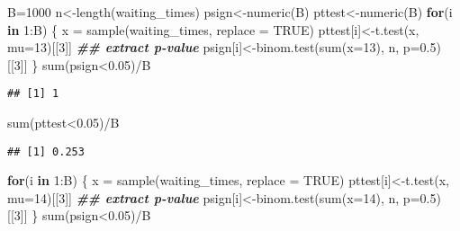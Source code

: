 \documentclass[
]{article}
\newenvironment{Shaded}{\begin{snugshade}}{\end{snugshade}}
\newcommand{\AttributeTok}[1]{\textcolor[rgb]{0.77,0.63,0.00}{#1}}
\newcommand{\ConstantTok}[1]{\textcolor[rgb]{0.00,0.00,0.00}{#1}}
\newcommand{\ControlFlowTok}[1]{\textcolor[rgb]{0.13,0.29,0.53}{\textbf{#1}}}
\newcommand{\DecValTok}[1]{\textcolor[rgb]{0.00,0.00,0.81}{#1}}
\newcommand{\DocumentationTok}[1]{\textcolor[rgb]{0.56,0.35,0.01}{\textbf{\textit{#1}}}}
\newcommand{\FloatTok}[1]{\textcolor[rgb]{0.00,0.00,0.81}{#1}}
\newcommand{\FunctionTok}[1]{\textcolor[rgb]{0.00,0.00,0.00}{#1}}
\newcommand{\NormalTok}[1]{#1}
\newcommand{\OtherTok}[1]{\textcolor[rgb]{0.56,0.35,0.01}{#1}}
\newcommand{\SpecialCharTok}[1]{\textcolor[rgb]{0.00,0.00,0.00}{#1}}
\begin{document}
\begin{Shaded}
\begin{Highlighting}[]
\NormalTok{B}\OtherTok{=}\DecValTok{1000}
\NormalTok{n}\OtherTok{\textless{}{-}}\FunctionTok{length}\NormalTok{(waiting\_times)}
\NormalTok{psign}\OtherTok{\textless{}{-}}\FunctionTok{numeric}\NormalTok{(B)}
\NormalTok{pttest}\OtherTok{\textless{}{-}}\FunctionTok{numeric}\NormalTok{(B)}
\ControlFlowTok{for}\NormalTok{(i }\ControlFlowTok{in} \DecValTok{1}\SpecialCharTok{:}\NormalTok{B) \{}
\NormalTok{  x }\OtherTok{=} \FunctionTok{sample}\NormalTok{(waiting\_times, }\AttributeTok{replace =} \ConstantTok{TRUE}\NormalTok{)}
\NormalTok{  pttest[i]}\OtherTok{\textless{}{-}}\FunctionTok{t.test}\NormalTok{(x, }\AttributeTok{mu=}\DecValTok{13}\NormalTok{)[[}\DecValTok{3}\NormalTok{]] }\DocumentationTok{\#\# extract p{-}value}
\NormalTok{  psign[i]}\OtherTok{\textless{}{-}}\FunctionTok{binom.test}\NormalTok{(}\FunctionTok{sum}\NormalTok{(}\AttributeTok{x=}\DecValTok{13}\NormalTok{), n, }\AttributeTok{p=}\FloatTok{0.5}\NormalTok{)[[}\DecValTok{3}\NormalTok{]]}
\NormalTok{\}}
\FunctionTok{sum}\NormalTok{(psign}\SpecialCharTok{\textless{}}\FloatTok{0.05}\NormalTok{)}\SpecialCharTok{/}\NormalTok{B}
\end{Highlighting}
\end{Shaded}

\begin{verbatim}
## [1] 1
\end{verbatim}

\begin{Shaded}
\begin{Highlighting}[]
\FunctionTok{sum}\NormalTok{(pttest}\SpecialCharTok{\textless{}}\FloatTok{0.05}\NormalTok{)}\SpecialCharTok{/}\NormalTok{B}
\end{Highlighting}
\end{Shaded}

\begin{verbatim}
## [1] 0.253
\end{verbatim}

\begin{Shaded}
\begin{Highlighting}[]
\ControlFlowTok{for}\NormalTok{(i }\ControlFlowTok{in} \DecValTok{1}\SpecialCharTok{:}\NormalTok{B) \{}
\NormalTok{  x }\OtherTok{=} \FunctionTok{sample}\NormalTok{(waiting\_times, }\AttributeTok{replace =} \ConstantTok{TRUE}\NormalTok{)}
\NormalTok{  pttest[i]}\OtherTok{\textless{}{-}}\FunctionTok{t.test}\NormalTok{(x, }\AttributeTok{mu=}\DecValTok{14}\NormalTok{)[[}\DecValTok{3}\NormalTok{]] }\DocumentationTok{\#\# extract p{-}value}
\NormalTok{  psign[i]}\OtherTok{\textless{}{-}}\FunctionTok{binom.test}\NormalTok{(}\FunctionTok{sum}\NormalTok{(}\AttributeTok{x=}\DecValTok{14}\NormalTok{), n, }\AttributeTok{p=}\FloatTok{0.5}\NormalTok{)[[}\DecValTok{3}\NormalTok{]]}
\NormalTok{\}}
\FunctionTok{sum}\NormalTok{(psign}\SpecialCharTok{\textless{}}\FloatTok{0.05}\NormalTok{)}\SpecialCharTok{/}\NormalTok{B}
\end{Highlighting}
\end{Shaded}
\end{document}
